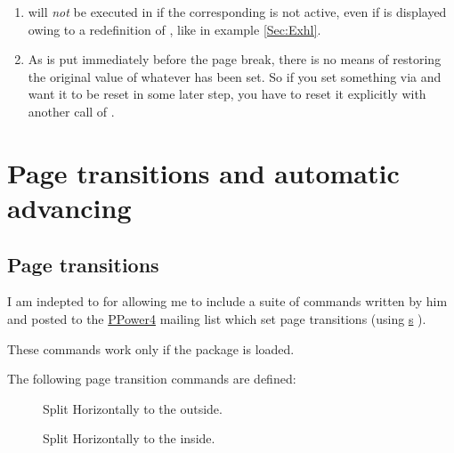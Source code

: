 \begin{slide}
\begin{enumerate}
  \item {} will \emph{not} be executed in  if the corresponding 
    is not active, even if  is displayed owing to a redefinition of ,
    like in example \ref{Sec:Exhl}.

  \item As  is put immediately before the page break, there is no means of restoring the original value
    of whatever has been set. So if you set something via  and want it to be reset in some later
    step, you have to reset it explicitly with another call of .
  \end{enumerate}

  \newslide

  \section{Page transitions and automatic advancing}\label{Sec:PageTrans}
  \subsection{Page transitions}
  I am indepted to \href{mailto:dongen@cs.ucc.ie}{} for allowing me to include a suite of commands
  written by him and posted to the \href{http://www-sp.iti.informatik.tu-darmstadt.de/software/ppower4/}{PPower4}
  mailing list which set page transitions (using
  \href{ftp://ftp.dante.de/tex-archive/help/Catalogue/entries/hyperref.html}{s} ).

  These commands work only if the  package is loaded.

    \newslide

  The following page transition commands are defined:\pause
  \begin{description}
  \item[{}]
    Split Horizontally to the outside. \pageTransitionSplitHO\pause

  \item[{}]
    Split Horizontally to the inside. \pageTransitionSplitHI\pause


\end{description}
\end{slide}
